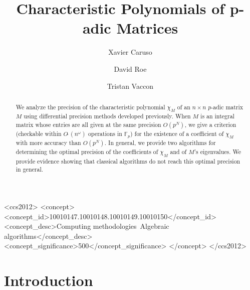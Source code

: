 \documentclass[sigconf]{acmart}
\newcommand{\Fp}{\mathbb{F}_p}
\newcommand{\softO}{O\tilde{~}}
\theoremstyle{definition}
\begin{document}
\title{Characteristic Polynomials of p-adic Matrices}

\author{Xavier Caruso}
\author{David Roe}
\author{Tristan Vaccon}


\begin{CCSXML}
<ccs2012>
<concept>
<concept_id>10010147.10010148.10010149.10010150</concept_id>
<concept_desc>Computing methodologies~Algebraic algorithms</concept_desc>
<concept_significance>500</concept_significance>
</concept>
</ccs2012>
\end{CCSXML}



\begin{abstract}
We analyze the precision of the characteristic polynomial $\chi_M$ of 
an $n \times n$ $p$-adic matrix $M$ using differential precision methods 
developed previously.  When $M$ is an integral matrix whose entries are 
all given at the same precision $O(p^N)$, we give a criterion (checkable 
within $\softO(n^\omega)$ operations in $\Fp$) for the existence of a
coefficient of $\chi_M$ with more accuracy than $O(p^N)$.
In general, we provide two algorithms for determining the optimal 
precision of the coefficients of $\chi_M$ and of $M$'s eigenvalues.
We provide evidence showing that classical algorithms do not reach
this optimal precision in general.
\end{abstract}

\maketitle

\section{Introduction}
\end{document}
